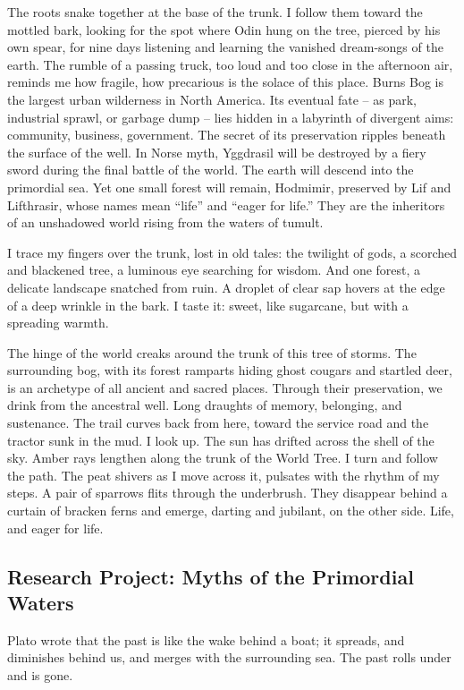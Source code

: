 \documentclass[letterpaper,10pt,headsepline]{scrreprt}
\begin{document}
The roots snake together at the base of the trunk. I follow them
toward the mottled bark, looking for the spot where Odin hung on the
tree, pierced by his own spear, for nine days listening and learning
the vanished dream-songs of the earth. The rumble of a passing truck,
too loud and too close in the afternoon air, reminds me how fragile,
how precarious is the solace of this place. Burns Bog is the largest
urban wilderness in North America. Its eventual fate -- as park,
industrial sprawl, or garbage dump -- lies hidden in a labyrinth of
divergent aims: community, business, government. The secret of its
preservation ripples beneath the surface of the well. In Norse myth,
Yggdrasil will be destroyed by a fiery sword during the final battle
of the world. The earth will descend into the primordial sea. Yet one
small forest will remain, Hodmimir, preserved by Lif and Lifthrasir,
whose names mean ``life'' and ``eager for life.'' They are the inheritors
of an unshadowed world rising from the waters of tumult. 

I trace my fingers over the trunk, lost in old tales: the twilight of
gods, a scorched and blackened tree, a luminous eye searching for
wisdom. And one forest, a delicate landscape snatched from ruin. A
droplet of clear sap hovers at the edge of a deep wrinkle in the bark.
I taste it: sweet, like sugarcane, but with a spreading warmth. 

The hinge of the world creaks around the trunk of this tree of storms.
The surrounding bog, with its forest ramparts hiding ghost cougars and
startled deer, is an archetype of all ancient and sacred places.
Through their preservation, we drink from the ancestral well. Long
draughts of memory, belonging, and sustenance. The trail curves back
from here, toward the service road and the tractor sunk in the mud. I
look up. The sun has drifted across the shell of the sky. Amber rays
lengthen along the trunk of the World Tree. I turn and follow the
path. The peat shivers as I move across it, pulsates with the rhythm
of my steps. A pair of sparrows flits through the underbrush. They
disappear behind a curtain of bracken ferns and emerge, darting and
jubilant, on the other side. Life, and eager for life.

\newpage
\subsection{Research Project: Myths of the Primordial Waters}

Plato wrote that the past is like the wake behind a boat; it spreads,
and diminishes behind us, and merges with the surrounding sea. The
past rolls under and is gone.
\end{document}
